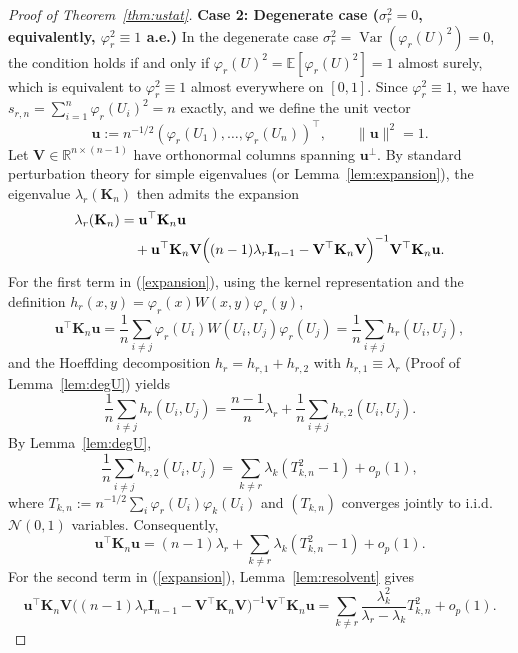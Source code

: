 \documentclass[11pt]{article}
\theoremstyle{plain}
\theoremstyle{remark}
\DeclareMathOperator{\Var}{Var}
\newcommand{\E}{\mathbb{E}}
\begin{document}
\begin{proof}[Proof of Theorem~\ref{thm:ustat}]
\textbf{Case 2: Degenerate case ($\sigma_r^2 = 0$, equivalently, $\varphi_r^2 \equiv 1$ a.e.)}
In the degenerate case $\sigma_r^2 = \Var(\varphi_r(U)^2) = 0$, the condition holds if and only if
$\varphi_r(U)^2 = \E[\varphi_r(U)^2] = 1$ almost surely, which is equivalent to
$\varphi_r^2 \equiv 1$ almost everywhere on $[0,1]$. Since $\varphi_r^2 \equiv 1$, we have
$s_{r,n} = \sum_{i=1}^n \varphi_r(U_i)^2 = n$ exactly, and we define the unit vector
\[
\mathbf{u} := n^{-1/2}(\varphi_r(U_1),\dots,\varphi_r(U_n))^\top,
\qquad
\|\mathbf{u}\|^2 = 1.
\]
Let $\mathbf{V} \in \mathbb{R}^{n \times (n-1)}$ have orthonormal columns spanning $\mathbf{u}^\perp$.
By standard perturbation theory for simple eigenvalues (or Lemma~\ref{lem:expansion}), the eigenvalue
$\lambda_r(\mathbf{K}_n)$ then admits the expansion
\begin{equation}\label{expansion}
\begin{split}
\lambda_r(\mathbf{K}_n) &= 
\mathbf{u}^\top \mathbf{K}_n \mathbf{u} \\
&\quad + \mathbf{u}^\top \mathbf{K}_n \mathbf{V} 
\Bigl(
(n-1)\lambda_r \mathbf{I}_{n-1} - \mathbf{V}^\top \mathbf{K}_n \mathbf{V}
\Bigr)^{-1} 
\mathbf{V}^\top \mathbf{K}_n \mathbf{u}.
\end{split}
\end{equation}
For the first term in 
(\ref{expansion}), using the kernel representation and the definition
$h_r(x,y) = \varphi_r(x)W(x,y)\varphi_r(y)$,
\[
\mathbf{u}^\top \mathbf{K}_n \mathbf{u}
= \frac{1}{n}\sum_{i \neq j}\varphi_r(U_i) W(U_i, U_j) \varphi_r(U_j)
= \frac{1}{n}\sum_{i \neq j}h_r(U_i, U_j),
\]
and the Hoeffding decomposition $h_r = h_{r,1} + h_{r,2}$ with $h_{r,1} \equiv \lambda_r$
(Proof of Lemma~\ref{lem:degU}) yields
\[
\frac{1}{n}\sum_{i \neq j}h_r(U_i, U_j)
= \frac{n-1}{n}\lambda_r + \frac{1}{n}\sum_{i \neq j}h_{r,2}(U_i, U_j).
\]
By Lemma~\ref{lem:degU},
\[
\frac{1}{n}\sum_{i \neq j}h_{r,2}(U_i, U_j)
= \sum_{k \neq r}\lambda_k(T_{k,n}^2 - 1) + o_p(1),
\]
where $T_{k,n} := n^{-1/2}\sum_i \varphi_r(U_i)\varphi_k(U_i)$ and $(T_{k,n})$ converges jointly to
i.i.d.\ $\mathcal{N}(0,1)$ variables. Consequently,
\[
\mathbf{u}^\top \mathbf{K}_n \mathbf{u}
= (n-1)\lambda_r + \sum_{k \neq r}\lambda_k(T_{k,n}^2 - 1) + o_p(1).
\]
For the second term in (\ref{expansion}), Lemma~\ref{lem:resolvent} gives
\[
\mathbf{u}^\top \mathbf{K}_n \mathbf{V}\bigl((n-1)\lambda_r \mathbf{I}_{n-1}
- \mathbf{V}^\top\mathbf{K}_n\mathbf{V}\bigr)^{-1}\mathbf{V}^\top\mathbf{K}_n \mathbf{u}
= \sum_{k \neq r}\frac{\lambda_k^2}{\lambda_r - \lambda_k}T_{k,n}^2 + o_p(1).
\]

\end{proof}
\end{document}
